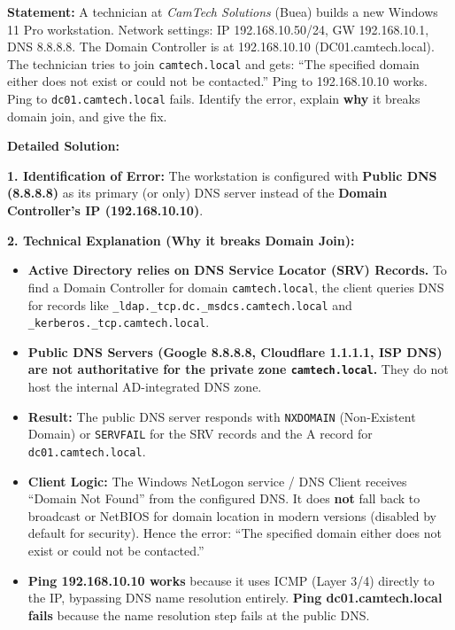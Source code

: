 \documentclass[11pt]{article}
\begin{document}
\begin{exoresolu}
\textbf{Statement:}
A technician at \textit{CamTech Solutions} (Buea) builds a new Windows 11 Pro workstation. Network settings: IP 192.168.10.50/24, GW 192.168.10.1, DNS 8.8.8.8. The Domain Controller is at 192.168.10.10 (DC01.camtech.local). The technician tries to join \texttt{camtech.local} and gets: ``The specified domain either does not exist or could not be contacted.'' Ping to 192.168.10.10 works. Ping to \texttt{dc01.camtech.local} fails. Identify the error, explain \textbf{why} it breaks domain join, and give the fix.

\tcblower
\textbf{Detailed Solution:}

\noindent\textbf{1. Identification of Error:}
The workstation is configured with \textbf{Public DNS (8.8.8.8)} as its primary (or only) DNS server instead of the \textbf{Domain Controller's IP (192.168.10.10)}.

\noindent\textbf{2. Technical Explanation (Why it breaks Domain Join):}
\begin{itemize}
    \item \textbf{Active Directory relies on DNS Service Locator (SRV) Records.} To find a Domain Controller for domain \texttt{camtech.local}, the client queries DNS for records like \texttt{\_ldap.\_tcp.dc.\_msdcs.camtech.local} and \texttt{\_kerberos.\_tcp.camtech.local}.
    \item \textbf{Public DNS Servers (Google 8.8.8.8, Cloudflare 1.1.1.1, ISP DNS) are \textbf{not authoritative} for the private zone \texttt{camtech.local}.} They do not host the internal AD-integrated DNS zone.
    \item \textbf{Result:} The public DNS server responds with \texttt{NXDOMAIN} (Non-Existent Domain) or \texttt{SERVFAIL} for the SRV records and the A record for \texttt{dc01.camtech.local}.
    \item \textbf{Client Logic:} The Windows NetLogon service / DNS Client receives ``Domain Not Found'' from the configured DNS. It does \textbf{not} fall back to broadcast or NetBIOS for domain location in modern versions (disabled by default for security). Hence the error: ``The specified domain either does not exist or could not be contacted.''
    \item \textbf{Ping 192.168.10.10 works} because it uses ICMP (Layer 3/4) directly to the IP, bypassing DNS name resolution entirely. \textbf{Ping dc01.camtech.local fails} because the name resolution step fails at the public DNS.
\end{itemize}


\end{exoresolu}
\end{document}
